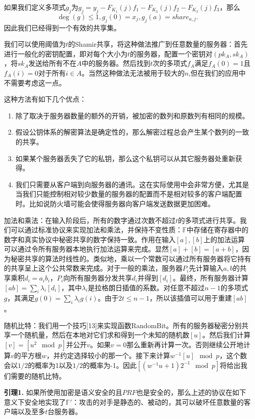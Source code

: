 如果我们定义多项式$g_j$为$g_j=y_j-F_{K_1}(j)f_1-F_{K_2}(j)f_2-F_{K_3}(j)f_3$，那么
$$\deg(g)\leq 1,g_j(0)=x_j,g_j(a)=share_{a,j}.$$
因此我们已经得到一个有效的共享集。

我们可以使用阈值为$t$的Shamir共享，将这种做法推广到任意数量的服务器：首先进行一般化的密钥配置，即对每个大小为$t$的服务器，配置一个密钥对$(pk_A,sk_A)$，将$sk_A$发送给所有不在$A$中的服务器。然后找到$t$次的多项式$f_A$满足$f_A(0)=1$且$f_A(i)=0$对于所有$i\in A$。当然这种做法无法被用于较大的$n$,但在我们的应用中不需要考虑这一点。

这种方法有如下几个优点：
\begin{enumerate}
	\item 除了取决于服务器数量的额外的开销，被加密的数列和原数列有相同的规模。
	\item 假设公钥体系的解密算法是确定性的，那么解密过程总会产生某个数列的一致的共享。
	\item 如果某个服务器丢失了它的私钥，那么这个私钥可以从其它服务器处重新获得。
	\item 我们只需要从客户端到向服务器的通讯。这在实际使用中会非常方便，尤其是当我们只能控制相对较少数量的服务器的配置而不是相对较多的客户端配置时。比如说防火墙可能会使得服务器向客户端发送数据更加困难。
\end{enumerate}

{\heiti 加法和乘法：}在输入阶段后，所有的数字通过次数不超过$t$的多项式进行共享。我们可以通过标准协议来实现加法和乘法，并保持不变性质：$\mathbb{F}$中存储在寄存器中的数字和真实协议中秘密共享的数字保持一致。作用在输入$[a],[b]$上的加法运算可以通过令所有服务器本地执行加法运算来完成。显然$[a]+[b]=[a+b]$，因为秘密共享的算法时线性的。类似地，乘以一个常数可以通过所有服务器将它持有的共享呈上这个公共常数来完成。对于一般的乘法，服务器$P_i$先计算输入$a,b$的共享乘积$d_i=a_ib_i$，$P_i$向所有服务器分发共享$d_i$并得到$[d_i]$。最终，所有服务器计算$[ab]=\sum_i \lambda_i[d_i]$，其中$\lambda_i$是拉格朗日插值的系数。对任意不超过$n-1$的多项式$g$，其满足$g(0)=\sum_i \lambda_ig(i)$。由于$2t\leq n-1$，所以该插值可以用于重建$[ab]$。

{\heiti 随机比特：}我们用一个技巧[13]来实现函数RandomBit。所有的服务器秘密分别共享一个随机量，然后在本地对它们求和得到一个未知的随机数$[u]$。然后我们计算$[v]=[u^2\mod p]$并公开$v$。如果$v=0$那么重新再计算一次。否则继续公开地计算$v$的平方根$w$，并约定选择较小的那一个。接下来计算$w^{-1}[u]\mod p$，这个数会以$1/2$的概率为1以及$1/2$的概率为-1。因此$[(w^{-1}u+1)2^{-1}\mod p]$将给出我们需要的随机比特。

\textbf{引理1.} 如果所使用加密是语义安全的且$PRF$也是安全的，那么上述的协议在如下意义下安全地实现了$\mathbb{F}'$：攻击的对手是静态的、被动的，其可以破坏任意数量的客户端以及至多$t$台服务器。

